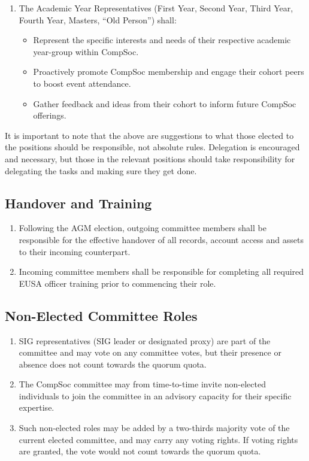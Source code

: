 \begin{enumerate}
\begin{itemize}
        \item Manage CompSoc's social media channels and digital marketing presence to engage members and promote events/activities.
        \item Monitor social media insights and analytics to optimize CompSoc's online member engagement.
    \end{itemize}
    \item The Academic Year Representatives (First Year, Second Year, Third Year, Fourth Year, Masters, ``Old Person'') shall:
    \begin{itemize}
        \item Represent the specific interests and needs of their respective academic year-group within CompSoc.
        \item Proactively promote CompSoc membership and engage their cohort peers to boost event attendance.  
        \item Gather feedback and ideas from their cohort to inform future CompSoc offerings.
    \end{itemize}
\end{enumerate}

It is important to note that the above are suggestions to what those elected to the positions should be responsible, not absolute rules. Delegation is encouraged and necessary, but those in the relevant positions should take responsibility for delegating the tasks and making sure they get done. 

\subsection{Handover and Training}
\begin{enumerate}
    \item Following the AGM election, outgoing committee members shall be responsible for the effective handover of all records, account access and assets to their incoming counterpart.
    \item Incoming committee members shall be responsible for completing all required EUSA officer training prior to commencing their role.  
\end{enumerate}

\subsection{Non-Elected Committee Roles}
\begin{enumerate}
    \item SIG representatives (SIG leader or designated proxy) are part of the committee and may vote on any committee votes, but their presence or absence does not count towards the quorum quota.
    \item The CompSoc committee may from time-to-time invite non-elected individuals to join the committee in an advisory capacity for their specific expertise.
    \item Such non-elected roles may be added by a two-thirds majority vote of the current elected committee, and may carry any voting rights. If voting rights are granted, the vote would not count towards the quorum quota.
\end{enumerate}
\vfill

